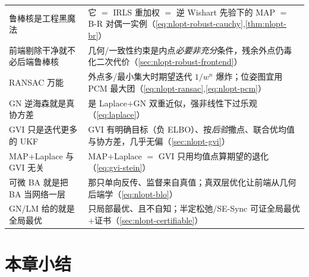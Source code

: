 \begin{table}[H]
\begin{tabular}{p{} p{}}
鲁棒核是工程黑魔法 & 它 $=$ IRLS 重加权 $=$ 逆 Wishart 先验下的 MAP $=$ B-R 对偶一实例（\cref{eq:nlopt-robust-cauchy},\cref{thm:nlopt-br}）\\
前端剔除干净就不必后端鲁棒核 & 几何/一致性约束是内点\emph{必要非充分}条件，残余外点仍毒化二次代价（\cref{sec:nlopt-robust-frontend}）\\
RANSAC 万能 & 外点多/最小集大时期望迭代 $1/w^n$ 爆炸；位姿图宜用 PCM 最大团（\cref{eq:nlopt-ransac},\cref{eq:nlopt-pcm}）\\
GN 逆海森就是真协方差 & 是 Laplace$+$GN 双重近似，强非线性下过乐观（\cref{eq:laplace}）\\
GVI 只是迭代更多的 UKF & GVI 有明确目标（负 ELBO）、按\emph{后验}撒点、联合优均值与协方差，几乎无偏（\cref{sec:nlopt-gvi}）\\
MAP$+$Laplace 与 GVI 无关 & MAP$+$Laplace $=$ GVI 只用均值点算期望的退化（\cref{eq:gvi-stein}）\\
可微 BA 就是把 BA 当网络一层 & 那只单向反传、监督来自真值；真双层优化让前端从几何后端学（\cref{eq:nlopt-blo}）\\
GN/LM 给的就是全局最优 & 只局部最优、且不自知；半定松弛/SE-Sync 可证全局最优$+$证书（\cref{sec:nlopt-certifiable}）\\
\bottomrule
\end{tabular}
\end{table}

\section*{本章小结}

